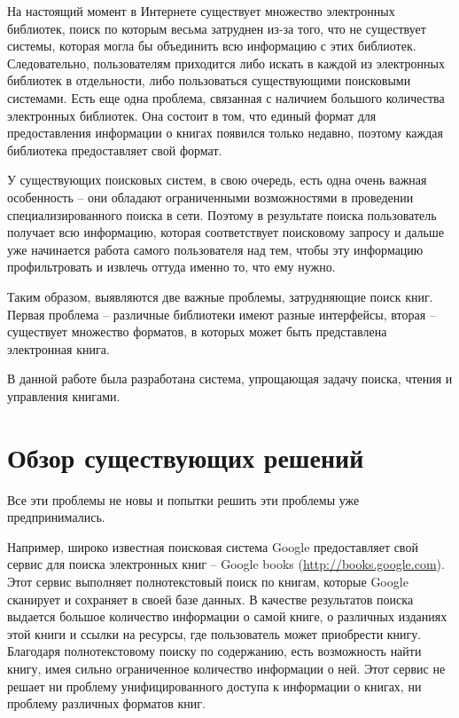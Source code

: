 \documentclass[a4paper]{report}
\begin{document}
На настоящий момент в Интернете существует множество электронных библиотек, поиск по которым весьма затруднен из-за того, что не существует системы, которая могла бы объединить всю информацию с этих библиотек. Следовательно, пользователям приходится либо искать в каждой из электронных библиотек в отдельности, либо пользоваться существующими поисковыми системами. Есть еще одна проблема, связанная с наличием большого количества электронных библиотек. Она состоит в том, что единый формат для предоставления информации о книгах появился только недавно, поэтому каждая библиотека предоставляет свой формат.

У существующих поисковых систем, в свою очередь,  есть одна очень важная особенность -- они обладают ограниченными возможностями в проведении специализированного поиска в сети. Поэтому в результате поиска пользователь получает всю информацию, которая соответствует поисковому запросу и дальше уже начинается работа самого пользователя над тем, чтобы эту информацию профильтровать и извлечь оттуда именно то, что ему нужно. 

Таким образом, выявляются две важные проблемы, затрудняющие поиск книг. Первая проблема -- различные библиотеки имеют разные интерфейсы, вторая -- существует множество форматов, в которых может быть представлена электронная книга. 

В данной работе была разработана система, упрощающая задачу поиска, чтения и управления книгами. 


\section{Обзор существующих решений}

Все эти проблемы не новы и попытки решить эти проблемы уже предпринимались.

Например, широко известная поисковая система Google предоставляет свой сервис для поиска электронных книг -- Google books (\url{http://books.google.com}). Этот сервис выполняет полнотекстовый поиск по книгам, которые Google сканирует и сохраняет в своей базе данных. В качестве результатов поиска выдается большое количество информации о самой книге, о различных изданиях этой книги и ссылки на ресурсы, где пользователь может приобрести книгу. Благодаря полнотекстовому поиску  по содержанию, есть возможность найти книгу, имея сильно ограниченное количество информации о ней. Этот сервис не решает ни проблему унифицированного доступа к информации о книгах, ни проблему различных форматов книг.
\end{document}
